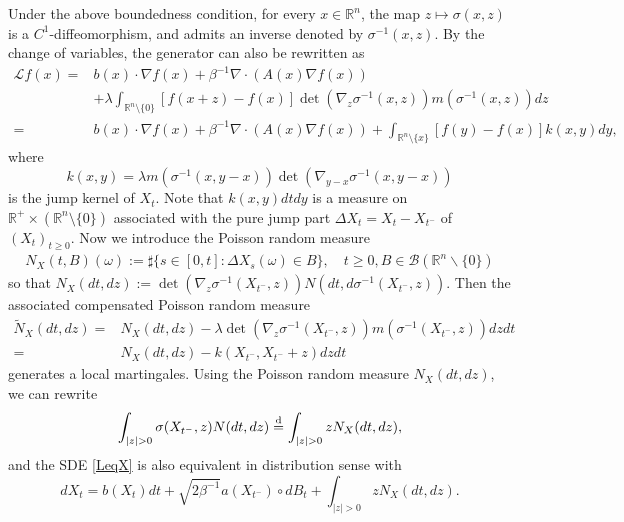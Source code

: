 \documentclass[10pt]{article}
\theoremstyle{definition}
\theoremstyle{remark}
\numberwithin{equation}{section}
\newcommand{\lam}{\lambda}
\begin{document}
Under the above boundedness condition, for every $x \in \mathbb{R}^n$, the map $z \mapsto \sigma(x,z)$ is a $C^1$-diffeomorphism, and admits an inverse denoted by $\sigma^{-1}(x,z)$. By the change of variables, the generator can also be rewritten as
\begin{align*}
    \mathcal{L}f(x) = & b(x) \cdot\nabla f(x) + \beta^{-1} \nabla\cdot (A(x)\nabla f(x))  \\
      & + \lambda \int_{\mathbb{R}^{n}\setminus \{0\}} [f(x+z)- f(x)] \det(\nabla_{z}\sigma^{-1}(x,z))m(\sigma^{-1}(x,z))dz \\
    = & b(x) \cdot\nabla f(x) + \beta^{-1} \nabla\cdot (A(x)\nabla f(x)) +   \int_{\mathbb{R}^{n}\setminus \{x\}} [f(y)-f(x)] k(x,y)dy,
\end{align*}
where 
{
\begin{equation}\label{kernel}
    k(x,y) = \lambda m(\sigma^{-1}(x,y- x))\det(\nabla_{y-x}\sigma^{-1}(x,y-x))
\end{equation}
 }
is the jump kernel of $X_t$. Note that $k(x,y)dtdy$ is a measure on $\mathbb{R}^{+}\times(\mathbb{R}^n\setminus\{0\})$ associated with the pure jump part $\Delta X_t = X_t - X_{t^{-}}$ of $(X_t)_{t\geq0}$. Now we introduce the Poisson random measure 
\begin{align*}
    N_X(t,B)(\omega):= \sharp \{s\in [0,t]:\Delta X_{s}(\omega) \in B\}, \quad t\geq 0, B\in \mathscr{B}(\mathbb{R}^{n}\backslash \{0\})
\end{align*}
so that $N_X(dt,dz):= \det(\nabla_z \sigma^{-1}(X_{t^{-}},z))N(dt, d\sigma^{-1}(X_{t^{-}},z))$. Then the associated compensated Poisson random measure 
\begin{align*}
    \widetilde{N}_X(dt,dz) = & N_X(dt,dz) - \lam\det(\nabla_z \sigma^{-1}(X_{t^{-}}, z))m(\sigma^{-1}(X_{t^{-}},z))dzdt \\
    = & N_X(dt,dz) -k(X_{t^{-}},X_{t^{-}} +z)dzdt
\end{align*}
generates a local martingales.
Using the Poisson random measure $N_X(dt,dz)$, we can rewrite
\begin{equation*}
    \int_{|z|>0} \sigma(X_{t^-},z) N(dt,dz) \overset{\text d}{=} \int_{|z|>0} z N_X(dt,dz),
\end{equation*}
and the SDE \eqref{LeqX} is also equivalent in distribution sense with
\begin{equation*}
     dX_t =  b(X_{t})dt +  \sqrt{2\beta^{-1}} a(X_{t^-}) \circ dB_t  + \int_{|z|>0} z N_X(dt,dz).
\end{equation*}
\end{document}
